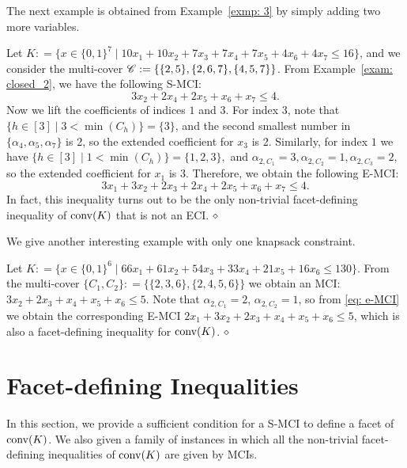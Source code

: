 The next example is obtained from Example~\ref{exmp: 3} by simply adding two more variables.
\begin{example}
Let $K: = \{x \in \{0,1\}^7 \mid 10 x_1 + 10 x_2 + 7 x_3 + 7 x_4 + 7 x_5 + 4 x_6 + 4 x_7 \leq 16\}$, and we consider the multi-cover $\mathscr{C}: = \{ \{2, 5\}, \{2, 6, 7\}, \{4, 5, 7\}\}$. From Example~\ref{exam: closed_2}, we have the following S-MCI: 
$$
3x_2 + 2x_4 + 2x_5 + x_6 + x_7 \leq 4.
$$
Now we lift the coefficients of indices $1$ and $3$. For index $3$, note that $\{h \in [3] \mid 3 < \min(C_h)\} = \{3\}$,
and the second smallest number in $\{\alpha_4, \alpha_5, \alpha_7\}$ is 2,
so the extended coefficient for $x_3$ is 2.
Similarly, for index $1$ we have $\{h \in [3] \mid 1 < \min(C_h)\} = \{1,2,3\},$ and $\alpha_{2, C_1} = 3, \alpha_{2, C_2} = 1, \alpha_{2, C_3} = 2$, so the extended coefficient for $x_1$ is 3. Therefore, we obtain the following E-MCI:
\begin{equation}
3x_1 + 3x_2 + 2x_3 + 2x_4 + 2x_5 + x_6 + x_7 \leq 4.
\end{equation}
In fact, this inequality turns out to be the only non-trivial facet-defining inequality of $\operatorname{conv}(K)$ that is not an ECI. 
$\hfill\diamond$
\end{example}

We give another interesting example with only one knapsack constraint.
\begin{example}
Let $K: = \{x \in \{0,1\}^6 \mid 66 x_1 + 61 x_2 + 54 x_3 + 33 x_4 + 21 x_5 + 16 x_6 \leq 130\}$. 
From the multi-cover $\{C_1, C_2\}: = \{\{2,3,6\},\{2,4,5,6\}\}$ we obtain an MCI: $3 x_2 + 2x_3 + x_4 + x_5 + x_6 \leq 5$. 
Note that $\alpha_{2, C_1} = 2$, $\alpha_{2, C_2} = 1$, so from \eqref{eq: e-MCI} we obtain the corresponding E-MCI $2x_1 + 3 x_2 + 2x_3 + x_4 + x_5 + x_6 \leq 5$, which is also a facet-defining inequality for $\operatorname{conv}(K)$. 
$\hfill\diamond$
\end{example}


\section{Facet-defining Inequalities}
\label{sec:facet}

In this section, we provide a sufficient condition for a S-MCI to define a facet of $\operatorname{conv}(K)$. We also given a family of instances in which all the non-trivial facet-defining inequalities of $\operatorname{conv}(K)$ are given by MCIs.




